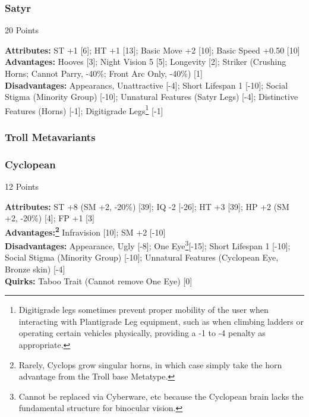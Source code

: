 \begin{multicols*}{3}
	\subsubsection*{Satyr}
	\begin{flushright}
		20 Points
	\end{flushright}
	\textbf{Attributes:} 
	ST +1 [6]; HT +1 [13]; Basic Move +2 [10]; Basic Speed +0.50 [10]
	\\\textbf{Advantages:} 
	Hooves [3]; Night Vision 5 [5]; Longevity [2]; Striker (Crushing Horns; Cannot Parry, -40\%; Front Arc Only, -40\%) [1]
	\\\textbf{Disadvantages:} 
	Appearancs, Unattractive [-4]; Short Lifespan 1 [-10]; Social Stigma (Minority Group) [-10]; Unnatural Features (Satyr Legs) [-4]; Distinctive Features (Horns) [-1]; Digitigrade Legs\footnote{Digitigrade legs sometimes prevent proper mobility of the user when interacting with Plantigrade Leg equipment, such as when climbing ladders or operating certain vehicles physically, providing a -1 to -4 penalty as appropriate.} [-1]
	
	\subsubsection{Troll Metavariants}
	
	\subsubsection*{Cyclopean}
	\begin{flushright}
		12 Points
	\end{flushright}
	\textbf{Attributes:} 
	ST +8 (SM +2, -20\%) [39]; IQ -2 [-26]; HT +3 [39]; HP +2 (SM +2, -20\%) [4]; FP +1 [3]
	\\\textbf{Advantages:\footnote{Rarely, Cyclops grow singular horns, in which case simply take the horn advantage from the Troll base Metatype.}} 
	Infravision [10]; SM +2 [-10]
	\\\textbf{Disadvantages:} 
	Appearance, Ugly [-8]; One Eye\footnote{Cannot be replaced via  Cyberware, etc because the Cyclopean brain lacks the fundamental structure for binocular vision.}[-15]; Short Lifespan 1 [-10]; Social Stigma (Minority Group) [-10]; Unnatural Features (Cyclopean Eye, Bronze skin) [-4]
	\\\textbf{Quirks:}
	Taboo Trait (Cannot remove One Eye) [0]
	

\end{multicols*}
